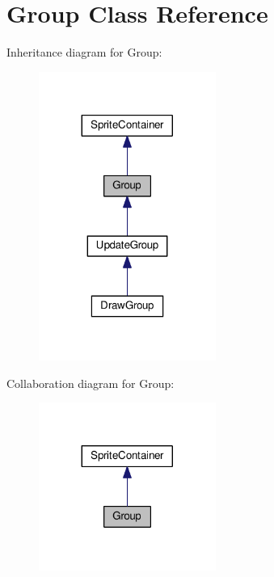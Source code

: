\hypertarget{class_group}{}\section{Group Class Reference}
\label{class_group}


Inheritance diagram for Group\+:\nopagebreak
\begin{figure}[H]
\begin{center}
\leavevmode
\includegraphics[width=164pt]{class_group__inherit__graph}
\end{center}
\end{figure}


Collaboration diagram for Group\+:\nopagebreak
\begin{figure}[H]
\begin{center}
\leavevmode
\includegraphics[width=164pt]{class_group__coll__graph}
\end{center}
\end{figure}
